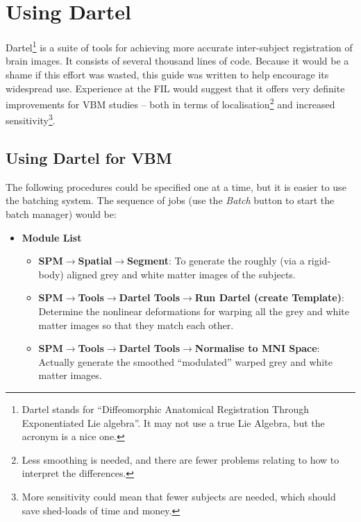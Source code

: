 \chapter{Using Dartel \label{Chap:dartelguide}}
\minitoc

\vskip 1.5cm

Dartel\footnote{Dartel stands for ``Diffeomorphic Anatomical Registration Through Exponentiated Lie algebra''.
It may not use a true Lie Algebra, but the acronym is a nice one.} is a suite of tools for achieving more accurate inter-subject registration of brain images.
It consists of several thousand lines of code. Because it would be a shame if this effort was wasted, this guide was written to help encourage its widespread use.
Experience at the FIL would suggest that it offers very definite improvements for VBM studies -- both in terms of localisation\footnote{Less smoothing is needed, and there are fewer problems relating to how to interpret the differences.} and increased sensitivity\footnote{More sensitivity could mean that fewer subjects are needed, which should save shed-loads of time and money.}.



\section{Using Dartel for VBM \label{Sec:dartel_vbm}}
The following procedures could be specified one at a time, but it is easier to use the batching system.
The sequence of jobs (use the \emph{Batch} button to start the batch manager) would be:
\begin{itemize}
\item{{\bf Module List}
  \begin{itemize}
  \item{{\bf SPM$\rightarrow$Spatial$\rightarrow$Segment}: To generate the roughly (via a rigid-body) aligned grey and white matter images of the subjects.}
  \item{{\bf SPM$\rightarrow$Tools$\rightarrow$Dartel Tools$\rightarrow$Run Dartel (create Template)}: Determine the nonlinear deformations for warping all the grey and white matter images so that they match each other.}
  \item{{\bf SPM$\rightarrow$Tools$\rightarrow$Dartel Tools$\rightarrow$Normalise to MNI Space}: Actually generate the smoothed ``modulated'' warped grey and white matter images.}
  \end{itemize}
}
\end{itemize}

